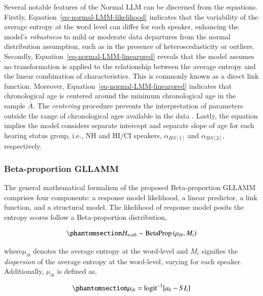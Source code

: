 \documentclass[
  authoryear,
  preprint,
  1p]{elsarticle}
\begin{document}
Several notable features of the Normal LLM can be discerned from the
equations. Firstly, Equation~\ref{eq-normal-LMM-likelihood} indicates
that the variability of the average entropy at the word level can differ
for each speaker, enhancing the model's \emph{robustness} to mild or
moderate data departures from the normal distribution assumption, such
as in the presence of heteroscedasticity or outliers. Secondly,
Equation~\ref{eq-normal-LMM-linearpred} reveals that the model assumes
no transformation is applied to the relationship between the average
entropy and the linear combination of characteristics. This is commonly
known as a direct link function. Moreover,
Equation~\ref{eq-normal-LMM-linearpred} indicates that chronological age
is centered around the minimum chronological age in the sample
\(\bar{A}\). The \emph{centering} procedure prevents the interpretation
of parameters outside the range of chronological ages available in the
data \citep{Everitt_et_al_2010}. Lastly, the equation implies the model
considers separate intercept and separate slope of age for each hearing
status group, i.e., NH and HI/CI speakers, \(\alpha_{HS[1]}\) and
\(\alpha_{HS[2]}\), respectively.

\subsubsection{Beta-proportion GLLAMM}\label{sec-M-SM-BGLLAMM}

The general mathematical formalism of the proposed Beta-proportion
GLLAMM comprises four components: a response model likelihood, a linear
predictor, a link function, and a structural model. The likelihood of
response model posits the entropy scores follow a Beta-proportion
distribution,

\begin{equation}\phantomsection\label{eq-beta-GLLAMM-likelihood}{
H_{wsib} \sim \text{BetaProp} \left( \mu_{ib}, M_{i} \right)
}\end{equation}

where\(\mu_{ib}\) denotes the average entropy at the word-level and
\(M_{i}\) signifies the \emph{dispersion} of the average entropy at the
word-level, varying for each speaker. Additionally, \(\mu_{ib}\) is
defined as,

\begin{equation}\phantomsection\label{eq-beta-GLLAMM-linpred}{
\mu_{ib} = \text{logit}^{-1}[ a_{b} - SI_{i} ]
}\end{equation}
\end{document}
